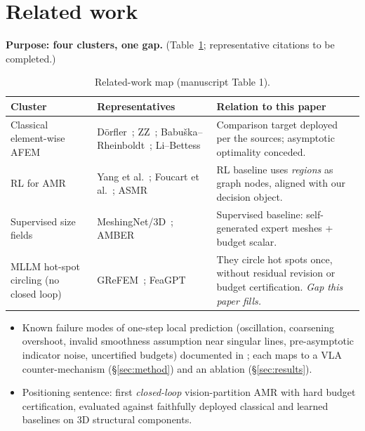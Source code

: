 \documentclass[preprint,12pt]{elsarticle}
\newenvironment{plan}{\begin{itemize}\setlength\itemsep{0.15em}}{\end{itemize}}
\begin{document}
\section{Related work}\label{sec:related}
\textbf{Purpose: four clusters, one gap.} (Table~\ref{tab:related}; representative
citations to be completed.)
\begin{table}[h]\centering\small
\caption{Related-work map (manuscript Table 1).}\label{tab:related}
\begin{tabularx}{\textwidth}{lXX}
\toprule
Cluster & Representatives & Relation to this paper \\
\midrule
Classical element-wise AFEM & D\"orfler~\cite{dorfler96}; ZZ~\cite{zz87};
  Babu\v{s}ka--Rheinboldt~\cite{babuska78}; Li--Bettess~\cite{libettess95} &
  Comparison target deployed per the sources; asymptotic optimality conceded. \\
RL for AMR & Yang et al.~\cite{yang23}; Foucart et al.~\cite{foucart23};
  ASMR~\cite{asmr23} & RL baseline uses \emph{regions} as graph nodes, aligned with
  our decision object. \\
Supervised size fields & MeshingNet/3D~\cite{meshingnet3d}; AMBER~\cite{amber} &
  Supervised baseline: self-generated expert meshes + budget scalar. \\
MLLM hot-spot circling (no closed loop) & GReFEM~\cite{grefem}; FeaGPT
  \cite{feagpt} & They circle hot spots once, without residual revision or budget
  certification. \emph{Gap this paper fills.} \\
\bottomrule
\end{tabularx}
\end{table}
\begin{plan}
  \item Known failure modes of one-step local prediction (oscillation, coarsening
        overshoot, invalid smoothness assumption near singular lines, pre-asymptotic
        indicator noise, uncertified budgets) documented in
        \cite{onate93,diez99}; each maps to a VLA counter-mechanism
        (\S\ref{sec:method}) and an ablation (\S\ref{sec:results}).
  \item Positioning sentence: first \emph{closed-loop} vision-partition AMR with hard
        budget certification, evaluated against faithfully deployed classical and
        learned baselines on 3D structural components.
\end{plan}
\end{document}
